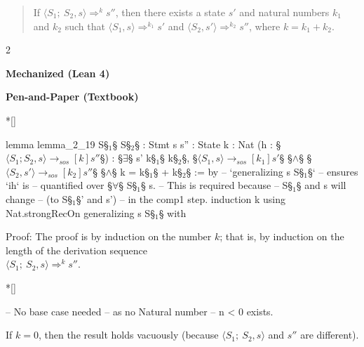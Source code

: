\begin{quotation}
    \noindent
    If \(\langle S_1;\ S_2, s \rangle \Rightarrow^k s''\), then there exists
    a state \(s'\) and natural numbers \(k_1\) and \(k_2\) such that
    \(\langle S_1, s \rangle \Rightarrow^{k_1} s'\) and \(\langle S_2, s' \rangle \Rightarrow^{k_2} s''\),
    where \(k = k_1 + k_2\).
\end{quotation}



\vspace{1em}
\begin{paracol}{2}
\begin{leftcolumn}
\centering \textbf{Mechanized (Lean 4)}
\end{leftcolumn}
\begin{rightcolumn}
\centering \textbf{Pen-and-Paper (Textbook)} \\\noindent
\end{rightcolumn}

\switchcolumn[1]*[]
\begin{leftcolumn}
    \begin{Lean_Code}
lemma lemma_2_19 {S§$_1$§ S§$_2$§ : Stmt}
    {s s'' : State} {k : Nat}
    (h : §\(\langle S_1; S_2, s \rangle \to_{sos}[k] s''\)§) :
    §\(\exists\)§ s' k§\(_1\)§ k§\(_2\)§, §\(\langle S_1, s \rangle \to_{sos}[k_1] s'\)§
    §\(\land\)§ §\(\langle S_2, s' \rangle \to_{sos}[k_2] s''\)§
    §\(\land\)§ k = k§\(_1\)§ + k§\(_2\)§ := by
  -- `generalizing s S§\(_1\)§`
  -- ensures `ih` is
  -- quantified over §\(\forall\)§ S§\(_1\)§ s.
  -- This is required because
  -- S§\(_1\)§ and s will change
  -- (to S§\(_1\)§' and s')
  -- in the comp1 step.
  induction k
  using Nat.strongRecOn
  generalizing s S§$_1$§ with
    \end{Lean_Code}
\end{leftcolumn}
\begin{rightcolumn}
Proof: The proof is by induction on the number \(k\); that is, by induction on the
length of the derivation sequence \\
\(\langle S_1;\ S_2, s \rangle \Rightarrow^k s''\).
\end{rightcolumn}
\vspace{2em}

\switchcolumn[1]*[]
\begin{leftcolumn}
    \begin{Lean_Code}
  -- No base case needed
  -- as no Natural number
  -- n < 0 exists.
    \end{Lean_Code}
\end{leftcolumn}
\begin{rightcolumn}
If \(k = 0\), then the result holds vacuously
(because \(\langle S_1;\ S_2, s \rangle\) and \(s''\) are different).
\end{rightcolumn}
\vspace{2em}


\end{paracol}

